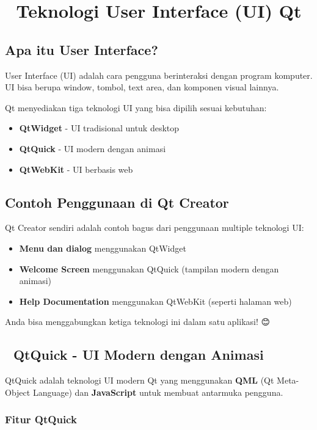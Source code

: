 \section{🎨 Teknologi User Interface (UI) Qt}

\subsection{Apa itu User Interface?}

User Interface (UI) adalah cara pengguna berinteraksi dengan program komputer. UI bisa berupa window, tombol, text area, dan komponen visual lainnya.

Qt menyediakan tiga teknologi UI yang bisa dipilih sesuai kebutuhan:
\begin{itemize}
\item \textbf{QtWidget} - UI tradisional untuk desktop
\item \textbf{QtQuick} - UI modern dengan animasi
\item \textbf{QtWebKit} - UI berbasis web
\end{itemize}

\subsection{Contoh Penggunaan di Qt Creator}

Qt Creator sendiri adalah contoh bagus dari penggunaan multiple teknologi UI:

\begin{itemize}
\item \textbf{Menu dan dialog} menggunakan QtWidget
\item \textbf{Welcome Screen} menggunakan QtQuick (tampilan modern dengan animasi)
\item \textbf{Help Documentation} menggunakan QtWebKit (seperti halaman web)
\end{itemize}

Anda bisa menggabungkan ketiga teknologi ini dalam satu aplikasi! 😊

\subsection{🚀 QtQuick - UI Modern dengan Animasi}

QtQuick adalah teknologi UI modern Qt yang menggunakan \textbf{QML} (Qt Meta-Object Language) dan \textbf{JavaScript} untuk membuat antarmuka pengguna.

\subsubsection{Fitur QtQuick}

